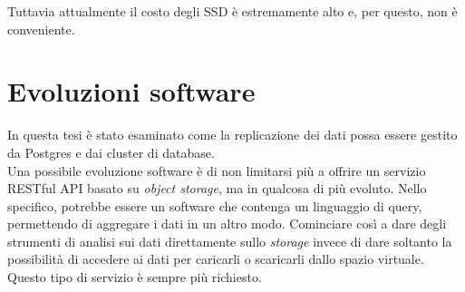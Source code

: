 Tuttavia attualmente il costo degli SSD \`{e} estremamente alto e, per questo, non \`{e} conveniente.

\item
\section{Evoluzioni software}
In questa tesi \`{e} stato esaminato come la replicazione dei dati possa essere gestito da Postgres e dai cluster di database.\\
Una possibile evoluzione software \`{e} di non limitarsi pi\`{u} a offrire un servizio RESTful API basato su \textit{object storage}, ma in qualcosa di pi\`{u} evoluto. Nello specifico, potrebbe essere un software che contenga un linguaggio di query, permettendo di aggregare i dati in un altro modo. Cominciare cos\`{i} a dare degli strumenti di analisi sui dati direttamente sullo \textit{storage} invece di dare soltanto la possibilit\`{a} di accedere ai dati per caricarli o scaricarli dallo spazio virtuale.\\
Questo tipo di servizio \`{e} sempre pi\`{u} richiesto.



